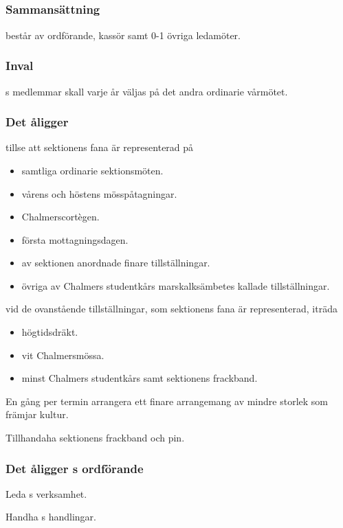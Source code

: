 \subsection{\FANBARERITFULL}
\subsubsection{Sammansättning}
\FANBARERIT{} består av ordförande, kassör samt 0-1 övriga ledamöter.

\subsubsection{Inval}
\FANBARERIT{}s medlemmar skall varje år väljas på det andra ordinarie vårmötet.

\subsubsection{Det åligger \FANBARERIT}
\label{sec:fanbarerit:function}
\begin{att}
	\item tillse att sektionens fana är representerad på
	\begin{itemize}
		\item samtliga ordinarie sektionsmöten.
		\item vårens och höstens mösspåtagningar.
		\item Chalmerscortègen.
		\item första mottagningsdagen.
		\item av sektionen anordnade finare tillställningar.
		\item övriga av Chalmers studentkårs marskalksämbetes kallade tillställningar.
	\end{itemize}
	\item vid de ovanstående tillställningar, som sektionens fana är representerad, iträda
	\begin{itemize}
		\item högtidsdräkt.
		\item vit Chalmersmössa.
		\item minst Chalmers studentkårs samt sektionens frackband.
	\end{itemize}
	\item En gång per termin arrangera ett finare arrangemang av mindre storlek som främjar kultur.
	\item Tillhandaha sektionens frackband och pin.
\end{att}

\subsubsection{Det åligger \FANBARERIT{}s ordförande}
\begin{att}
	\item Leda \FANBARERIT{}s verksamhet.
	\item Handha \FANBARERIT{}s handlingar.
\end{att}

